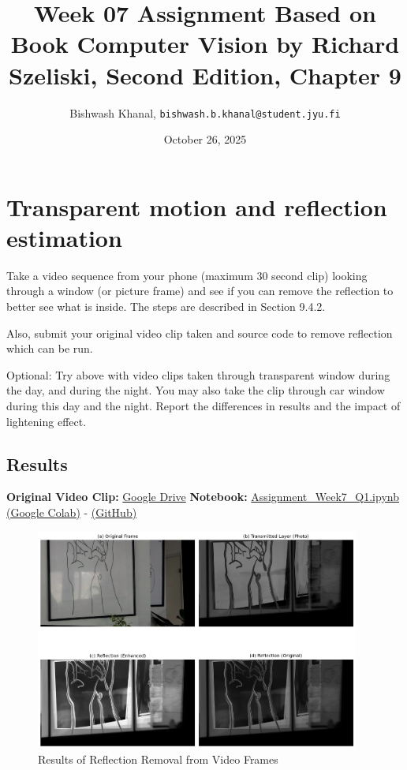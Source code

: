 \documentclass[12pt,a4paper]{article}
\title{Week 07 Assignment Based on Book Computer Vision by Richard Szeliski, Second Edition, Chapter 9}
\author{Bishwash Khanal, \texttt{bishwash.b.khanal@student.jyu.fi}}
\date{October 26, 2025}
\begin{document}
\maketitle

\section{Transparent motion and reflection estimation}
Take a video sequence from your phone (maximum 30 second clip) looking through a window (or picture frame) and see if you can remove the 
reflection to better see what is inside. The steps are described in Section 9.4.2.

Also, submit your original video clip taken and source code to remove reflection which can be run.

Optional: Try above with video clips taken through transparent window during the day, and during the night. You may also take the clip 
through car window during this day and the night. Report the differences in results and the impact of lightening effect.

\subsection{Results}
\textbf{Original Video Clip:} \href{https://drive.google.com/file/d/1gjEgFKrlBo2PgFSqi23-u5K3uIAr0AF5/view?usp=sharing}{Google Drive}
\newline
\textbf{Notebook:} \href{https://colab.research.google.com/drive/1H8oc060oYT3zyzLS-TISJCzxbsjmcvuA?usp=sharing}{Assignment\_Week7\_Q1.ipynb (Google Colab)} - 
\href{https://github.com/bkhanal-11/ties411_cvip_jyu/blob/master/assignment7/src/Assignment_Week7_Q1.ipynb}{(GitHub)}

\begin{figure}[htb]
    \centering
    \includegraphics[width=0.95\textwidth]{src/reflection_removal_results.png}
    \caption{Results of Reflection Removal from Video Frames}
    \label{fig:comparison}
\end{figure}
\end{document}
